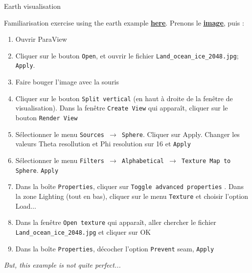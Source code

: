 \documentclass{beamer}
\begin{document}
\begin{frame}{Earth visualisation}
    \footnotesize
    
    Familiarisation exercise using the earth example \href{https://fr.wikibooks.org/wiki/Introduction\_\%C3\%A0\_ParaView/Quelques_exemples_simples}{\bf\underline{here}}. Prenons le \href{https://commons.wikimedia.org/wiki/File:Land_ocean_ice_2048.jpg}{\bf\underline{image}}, puis :
    \begin{enumerate}
        \item Ouvrir ParaView
        \item Cliquer sur le bouton \texttt{Open}, et ouvrir le fichier \texttt{Land\_ocean\_ice\_2048.jpg}; \texttt{Apply}.
        \item Faire bouger l'image avec la souris
        \item Cliquer sur le bouton \texttt{Split vertical} (en haut à droite de la fenêtre de visualisation). Dans la fenêtre \texttt{Create View} qui apparaît, cliquer sur le bouton \texttt{Render View}
        \item Sélectionner le menu \texttt{Sources $\rightarrow$ Sphere}. Cliquer sur Apply. Changer les valeurs Theta resollution et Phi resolution sur 16 et \texttt{Apply}
        \item Sélectionner le menu \texttt{Filters $\rightarrow$ Alphabetical $\rightarrow$ Texture Map to Sphere}. \texttt{Apply}
        \item Dans la boîte \texttt{Properties}, cliquer sur \texttt{Toggle advanced properties} . Dans la zone Lighting (tout en bas), cliquer sur le menu \texttt{Texture} et choisir l'option Load$\dots$
        \item Dans la fenêtre \texttt{Open texture} qui apparaît, aller chercher le fichier \texttt{Land\_ocean\_ice\_2048.jpg} et cliquer sur OK
        \item Dans la boîte \texttt{Properties}, décocher l'option \texttt{Prevent} seam, \texttt{Apply}
    \end{enumerate}
    
    {\it But, this example is not quite perfect...}

    

\end{frame}{}
\end{document}
